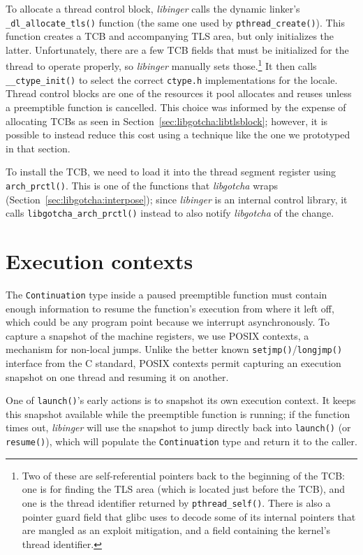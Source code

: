 To allocate a thread control block, \textit{libinger} calls the dynamic linker's
\texttt{\_dl\_allocate\_tls()} function (the same one used by
\texttt{pthread\_create()}).  This function creates a TCB and accompanying TLS area,
but only initializes the latter.  Unfortunately, there are a few TCB fields that must
be initialized for the thread to operate properly, so \textit{libinger} manually sets
those.\footnote{Two of these are self-referential pointers back to the beginning of
the TCB: one is for finding the TLS area (which is located just before the
TCB), and one is the thread identifier returned by \texttt{pthread\_self()}.  There
is also a pointer guard field that glibc uses to decode some of its internal pointers
that are mangled as an exploit mitigation, and a field containing the kernel's thread
identifier.}  It then calls \texttt{\_\_ctype\_init()} to select the correct
\texttt{ctype.h} implementations for the locale.  Thread control blocks are one of
the resources it pool allocates and reuses unless a preemptible function is
cancelled.  This choice was informed by the expense of allocating TCBs as seen in
Section~\ref{sec:libgotcha:libtlsblock}; however, it is possible to instead reduce
this cost using a technique like the one we prototyped in that section.

To install the TCB, we need to load it into the thread segment register using
\texttt{arch\_prctl()}.  This is one of the functions that \textit{libgotcha}
wraps (Section~\ref{sec:libgotcha:interpose}); since \textit{libinger} is an internal
control library, it calls \texttt{libgotcha\_arch\_prctl()} instead to also notify
\textit{libgotcha} of the change.


\section{Execution contexts}
\label{sec:libinger:contexts}

The \texttt{Continuation} type inside a paused preemptible function must contain
enough information to resume the function's execution from where it left off, which
could be any program point because we interrupt asynchronously.  To capture a
snapshot
of the machine registers, we use POSIX contexts, a mechanism for non-local jumps.
Unlike the better known \texttt{setjmp()}/\texttt{longjmp()} interface from the C
standard, POSIX contexts permit capturing an execution snapshot on one thread and
resuming it on another.

One of \texttt{launch()}'s early actions is to snapshot its own execution context.
It keeps this snapshot available while the preemptible function is running; if the
function times out, \textit{libinger} will use the snapshot to jump directly back
into \texttt{launch()} (or \texttt{resume()}), which will populate the
\texttt{Continuation} type and return it to the caller.


